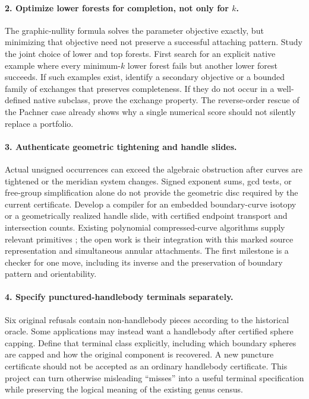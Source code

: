 \paragraph{2. Optimize lower forests for completion, not only for $k$.}
The graphic-nullity formula solves the parameter objective exactly, but
minimizing that objective need not preserve a successful attaching pattern.
Study the joint choice of lower and top forests.  First search for an
explicit native example where every minimum-$k$ lower forest fails but
another lower forest succeeds.  If such examples exist, identify a secondary
objective or a bounded family of exchanges that preserves completeness.
If they do not occur in a well-defined native subclass, prove the exchange
property.  The reverse-order rescue of the Pachner case already shows why
a single numerical score should not silently replace a portfolio.

\paragraph{3. Authenticate geometric tightening and handle slides.}
Actual unsigned occurrences can exceed the algebraic obstruction after
curves are tightened or the meridian system changes.  Signed exponent sums,
gcd tests, or free-group simplification alone do not provide the geometric
disc required by the current certificate.  Develop a compiler for an
embedded boundary-curve isotopy or a geometrically realized handle slide,
with certified endpoint transport and intersection counts.  Existing
polynomial compressed-curve algorithms supply relevant primitives
\cite{LackenbyCurves2026}; the open work is their integration with this
marked source representation and simultaneous annular attachments.
The first milestone is a checker for one move, including its inverse and
the preservation of boundary pattern and orientability.

\paragraph{4. Specify punctured-handlebody terminals separately.}
Six original refusals contain non-handlebody pieces according to the
historical oracle.  Some applications may instead want a handlebody after
certified sphere capping.  Define that terminal class explicitly, including
which boundary spheres are capped and how the original component is
recovered.  A new puncture certificate should not be accepted as an ordinary
handlebody certificate.  This project can turn otherwise misleading
``misses'' into a useful terminal specification while preserving the
logical meaning of the existing genus census.

